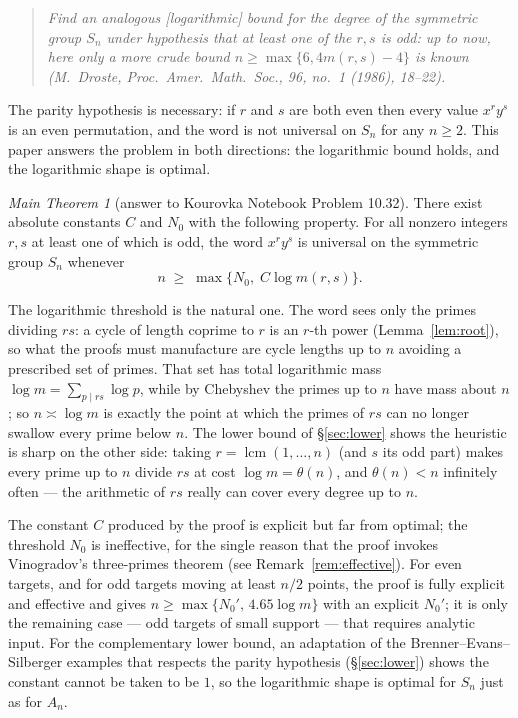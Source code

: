 \documentclass[11pt]{amsart}
\numberwithin{equation}{section}
\theoremstyle{remark}
\newtheorem*{mainthm}{Main Theorem}
\begin{document}
\begin{quote}
\emph{Find an analogous \textup{[}logarithmic\textup{]} bound for the degree of the
symmetric group $S_n$ under hypothesis that at least one of the $r,s$ is odd:
up to now, here only a more crude bound $n\ge\max\{6,4m(r,s)-4\}$ is known
\textup{(}M.~Droste, Proc.\ Amer.\ Math.\ Soc., 96, no.~1 (1986),
18--22\textup{)}.}
\end{quote}

The parity hypothesis is necessary: if $r$ and $s$ are both even then every value
$x^ry^s$ is an even permutation, and the word is not universal on $S_n$ for any
$n\ge 2$. This paper answers the problem in both directions: the logarithmic
bound holds, and the logarithmic shape is optimal.

\begin{mainthm}[answer to Kourovka Notebook Problem 10.32]
There exist absolute constants $C$ and $N_0$ with the following property. For all
nonzero integers $r,s$ at least one of which is odd, the word $x^ry^s$ is universal
on the symmetric group $S_n$ whenever
\[
n\;\ge\;\max\{N_0,\;C\log m(r,s)\}.
\]
\end{mainthm}

The logarithmic threshold is the natural one. The word sees only the primes
dividing $rs$: a cycle of length coprime to $r$ is an $r$-th power
(Lemma~\ref{lem:root}), so what the proofs must manufacture are cycle lengths up
to $n$ avoiding a prescribed set of primes. That set has total logarithmic mass
$\log m=\sum_{p\mid rs}\log p$, while by Chebyshev the primes up to $n$ have
mass about $n$; so $n\asymp\log m$ is exactly the point at which the primes of
$rs$ can no longer swallow every prime below $n$. The lower bound of
\S\ref{sec:lower} shows the heuristic is sharp on the other side: taking
$r=\operatorname{lcm}(1,\dots,n)$ (and $s$ its odd part) makes every prime up
to $n$ divide $rs$ at cost $\log m=\theta(n)$, and $\theta(n)<n$ infinitely
often --- the arithmetic of $rs$ really can cover every degree up to $n$.

The constant $C$ produced by the proof is explicit but far from optimal; the
threshold $N_0$ is ineffective, for the single reason that the proof invokes
Vinogradov's three-primes theorem (see Remark~\ref{rem:effective}). For even
targets, and for odd targets moving at least $n/2$ points, the proof is fully
explicit and effective and gives $n\ge\max\{N_0',\,4.65\log m\}$ with an explicit
$N_0'$; it is only the remaining case --- odd targets of small support --- that
requires analytic input. For the complementary lower bound, an adaptation of the
Brenner--Evans--Silberger examples that respects the parity hypothesis
(\S\ref{sec:lower}) shows the constant cannot be taken to be $1$, so the
logarithmic shape is optimal for $S_n$ just as for $A_n$.
\end{document}
